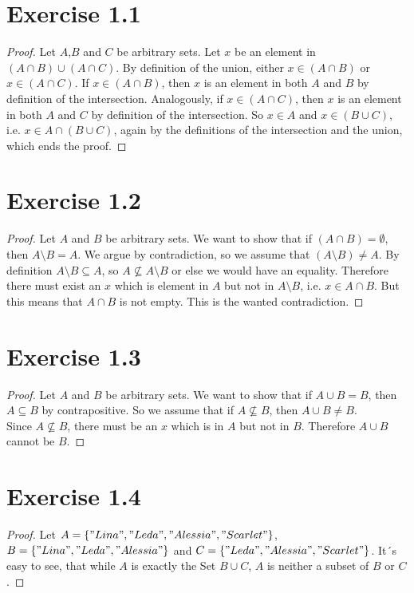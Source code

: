 \documentclass{article} %
\newcommand{\homeworkNumber}{1}
\begin{document}
\section*{Exercise \homeworkNumber.1}

\begin{proof}
Let $A$,$B$ and $C$ be arbitrary sets. Let $x$ be an element in $(A \cap B) \cup (A \cap C)$. By definition of the union, either $x \in (A \cap B)$ or $ x \in (A \cap C)$. If $x \in (A \cap B)$, then $x$ is an element in both $A$ and $B$ by definition of the intersection. Analogously, if $x \in (A \cap C)$, then $x$ is an element in both $A$ and $C$ by definition of the intersection. So $x \in A$ and $x \in (B \cup C)$, i.e. $x \in A \cap (B \cup C) $, again by the definitions of the intersection and the union, which ends the proof.

\end{proof}

\section*{Exercise \homeworkNumber.2}

\begin{proof}
Let $A$ and $B$ be arbitrary sets. We want to show that if $(A \cap B) = \emptyset$, then $A \setminus B = A$. We argue by contradiction, so we assume that $(A \setminus B) \neq A$.
By definition $A \setminus B \subseteq A$, so $A 	\not\subseteq A \setminus B$ or else we would have an equality. Therefore there must exist an $x$ which is element in $A$ but not in $A \setminus B$, i.e. $x \in A \cap B$. But this means that $A \cap B$ is not empty. This is the wanted contradiction.


\end{proof}


\section*{Exercise \homeworkNumber.3}

\begin{proof}
Let $A$ and $B$ be arbitrary sets. We want to show that if $A \cup B = B$, then $A \subseteq B$ by contrapositive. So we assume that if $A \not\subseteq B$, then $A \cup B \neq B$.\\
Since $A \not\subseteq B$, there must be an $x$ which is in $A$ but not in $B$. Therefore $A \cup B$ cannot be $B$.


\end{proof}

\section*{Exercise \homeworkNumber.4}

\begin{proof}
Let $A = \{"Lina", "Leda", "Alessia", "Scarlet"\}$, $B = \{"Lina", "Leda", "Alessia"\}$ and \linebreak $C  = \{"Leda", "Alessia", "Scarlet"\}$. It´s easy to see, that while $A$ is exactly the Set $B \cup C$, $A$ is neither a subset of $B$ or $C$.

 
\end{proof}
\end{document}
